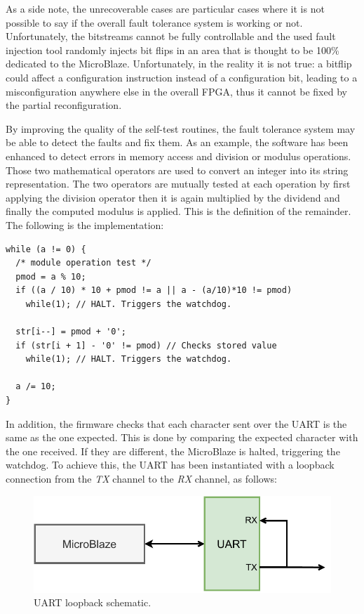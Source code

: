 As a side note, the unrecoverable cases are particular cases where it is not possible to say if the overall fault tolerance system is working or not. Unfortunately, the bitstreams cannot be fully controllable and the used fault injection tool randomly injects bit flips in an area that is thought to be 100\% dedicated to the MicroBlaze. Unfortunately, in the reality it is not true: a bitflip could affect a configuration instruction instead of a configuration bit, leading to a misconfiguration anywhere else in the overall FPGA, thus it cannot be fixed by the partial reconfiguration.\bigskip

By improving the quality of the self-test routines, the fault tolerance system may be able to detect the faults and fix them. As an example, the software has been enhanced to detect errors in memory access and division or modulus operations. Those two mathematical operators are used to convert an integer into its string representation. The two operators are mutually tested at each operation by first applying the division operator then it is again multiplied by the dividend and finally the computed modulus is applied. This is the definition of the remainder. The following is the implementation:

\begin{lstlisting}[style=C]
while (a != 0) {
  /* module operation test */
  pmod = a % 10;
  if ((a / 10) * 10 + pmod != a || a - (a/10)*10 != pmod) 
    while(1); // HALT. Triggers the watchdog.
  
  str[i--] = pmod + '0';
  if (str[i + 1] - '0' != pmod) // Checks stored value
    while(1); // HALT. Triggers the watchdog.
  
  a /= 10;
}
\end{lstlisting}

In addition, the firmware checks that each character sent over the UART is the same as the one expected. This is done by comparing the expected character with the one received. If they are different, the MicroBlaze is halted, triggering the watchdog. To achieve this, the UART has been instantiated with a loopback connection from the \textit{TX} channel to the \textit{RX} channel, as follows:

\begin{figure}[H]
\centering
\includegraphics[width=0.95\linewidth]{images/chapter5/sch.pdf}
\caption{UART loopback schematic.}
\end{figure}


